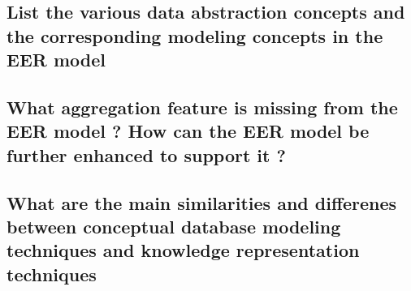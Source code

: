 \subsection{List the various data abstraction concepts and the corresponding modeling concepts in the EER model}

\subsection{What aggregation feature is missing from the EER model ? How can the EER model be further enhanced to support it ?}

\subsection{What are the main similarities and differenes between conceptual database modeling techniques and knowledge representation techniques}
